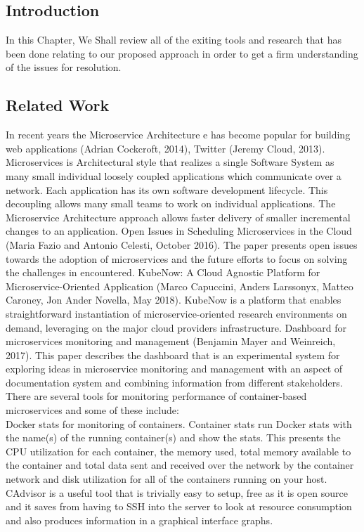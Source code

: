 \documentclass{article}
\begin{document}
\subsection{Introduction}
In this Chapter, We Shall review all of the exiting tools and research that has been done relating to our proposed approach in order to get a firm understanding of the issues for resolution.
\subsection{Related Work}
In recent years the Microservice Architecture e has become popular for building web applications (Adrian Cockcroft, 2014), Twitter (Jeremy Cloud, 2013). Microservices is Architectural style that realizes a single Software System as many small individual loosely coupled applications which communicate over a network. Each application has its own software development lifecycle. This decoupling allows many small teams to work on individual applications. The Microservice Architecture approach allows faster delivery of smaller incremental changes to an application.
Open Issues in Scheduling Microservices in the Cloud (Maria Fazio and Antonio Celesti, October 2016). The paper presents open issues towards the adoption of microservices and the future efforts to focus on solving the challenges in encountered.
KubeNow: A Cloud Agnostic Platform for Microservice-Oriented Application (Marco Capuccini, Anders Larssonyx, Matteo Caroney, Jon Ander Novella, May 2018). KubeNow is a platform that enables straightforward instantiation of microservice-oriented research environments on demand, leveraging on the major cloud providers infrastructure.
Dashboard for microservices monitoring and management (Benjamin Mayer and Weinreich, 2017). This paper describes the dashboard that is an experimental system for exploring ideas in microservice monitoring and management with an aspect of documentation system and combining information from different stakeholders.
 There are several tools for monitoring performance of container-based microservices and some of these include:\\
 Docker stats for monitoring of containers. Container stats run Docker stats with the name(s) of the running container(s) and show the stats. This presents the CPU utilization for each container, the memory used, total memory available to the container and total data sent and received over the network by the container network and disk utilization for all of the containers running on your host. \\ CAdvisor is a useful tool that is trivially easy to setup, free as it is open source and it saves from having to SSH into the server to look at resource consumption and also produces information in a graphical interface graphs. \\
  
\end{document}
